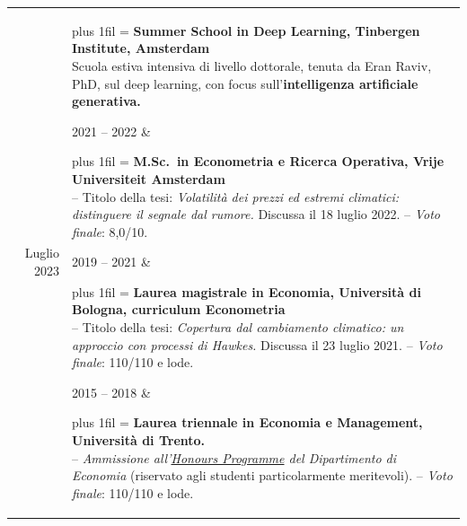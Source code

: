 \documentclass[10pt,a4paper]{article}
\newlength{\iconsep}
\newlength{\eduindent}
\newcommand{\edu}[4][0pt]{%
  #2 &
  \parbox[t]{\linewidth}{%
    \rightskip=0pt plus 1fil
    \parfillskip=0pt
    \baselineskip=9.5pt
    \lineskiplimit=0pt
    \settowidth{\eduindent}{\small\faBookmark\hspace{\iconsep}}%
    \hangindent=\eduindent
    \hangafter=1
    \textcolor{accent}{\small\faBookmark}\hspace{\iconsep}\textbf{#3}\\
    \footnotesize #4%
  }\tabularnewline
  \noalign{\vskip #1}%
}
\begin{document}
\noindent
\begin{tabularx}{\textwidth}{@{}>{\raggedleft\arraybackslash}r@{\hspace{0.75cm}}X@{}}
\edu[14.33pt]{Luglio 2023}{Summer School in Deep Learning, Tinbergen Institute, Amsterdam}{Scuola estiva intensiva di livello dottorale, tenuta da Eran Raviv, PhD, sul deep learning, con focus sull'\textbf{intelligenza artificiale generativa.}}
\edu[4.70pt]{2021 -- 2022}{M.Sc.\ in Econometria e Ricerca Operativa, Vrije Universiteit Amsterdam}{-- Titolo della tesi: \textit{Volatilità dei prezzi ed estremi climatici: distinguere il segnale dal rumore.} Discussa il 18 luglio 2022. -- \textit{Voto finale}: 8,0/10.}
\edu[4.70pt]{2019 -- 2021}{Laurea magistrale in Economia, Università di Bologna, curriculum Econometria}{-- Titolo della tesi: \textit{Copertura dal cambiamento climatico: un approccio con processi di Hawkes.} Discussa il 23 luglio 2021. -- \textit{Voto finale}: 110/110 e lode.}
\edu{2015 -- 2018}{Laurea triennale in Economia e Management, Università di Trento.}{-- \textit{Ammissione all'\underline{Honours Programme} del Dipartimento di Economia} (riservato agli studenti particolarmente meritevoli). -- \textit{Voto finale}: 110/110 e lode.}
\end{tabularx}
\end{document}
